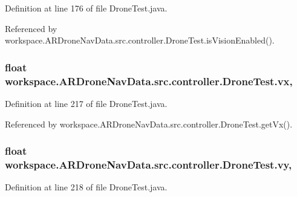 Definition at line 176 of file Drone\+Test.\+java.



Referenced by workspace.\+A\+R\+Drone\+Nav\+Data.\+src.\+controller.\+Drone\+Test.\+is\+Vision\+Enabled().

\hypertarget{classworkspace_1_1_a_r_drone_nav_data_1_1src_1_1controller_1_1_drone_test_aee5b32437faf364431eb128b575fb0e8}{}
\subsubsection[{vx}]{\setlength{\rightskip}{0pt plus 5cm}float workspace.\+A\+R\+Drone\+Nav\+Data.\+src.\+controller.\+Drone\+Test.\+vx\hspace{0.3cm}{\ttfamily [static]}, {\ttfamily [protected]}}\label{classworkspace_1_1_a_r_drone_nav_data_1_1src_1_1controller_1_1_drone_test_aee5b32437faf364431eb128b575fb0e8}


Definition at line 217 of file Drone\+Test.\+java.



Referenced by workspace.\+A\+R\+Drone\+Nav\+Data.\+src.\+controller.\+Drone\+Test.\+get\+Vx().

\hypertarget{classworkspace_1_1_a_r_drone_nav_data_1_1src_1_1controller_1_1_drone_test_a3f83a92a77d084e233ab027708712b44}{}
\subsubsection[{vy}]{\setlength{\rightskip}{0pt plus 5cm}float workspace.\+A\+R\+Drone\+Nav\+Data.\+src.\+controller.\+Drone\+Test.\+vy\hspace{0.3cm}{\ttfamily [static]}, {\ttfamily [protected]}}\label{classworkspace_1_1_a_r_drone_nav_data_1_1src_1_1controller_1_1_drone_test_a3f83a92a77d084e233ab027708712b44}


Definition at line 218 of file Drone\+Test.\+java.



